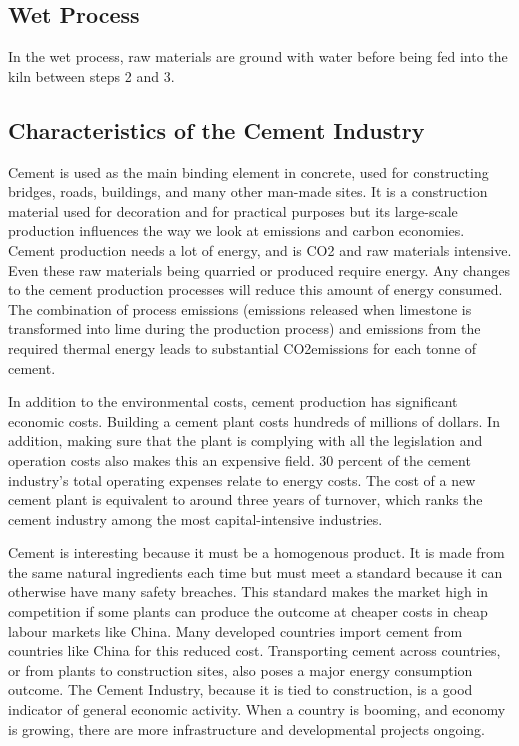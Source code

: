 \subsection{Wet Process}

In the wet process, raw materials are ground with water before being fed into the kiln between steps 2 and 3.

\subsection{Characteristics of the Cement Industry}

Cement is used as the main binding element in concrete, used for constructing bridges, roads, buildings, and many other man-made sites. It is a construction material used for decoration and for practical purposes but its large-scale production influences the way we look at emissions and carbon economies.
Cement production needs a lot of energy, and is CO2 and raw materials intensive. Even these raw materials being quarried or produced require energy. Any changes to the cement production processes will reduce this amount of energy consumed. The combination of process emissions (emissions released when limestone is transformed into lime during the production process) and emissions from the required thermal energy leads to substantial CO2emissions for each tonne of cement. 

In addition to the environmental costs, cement production has significant economic costs.  Building a cement plant costs hundreds of millions of dollars. In addition, making sure that the plant is complying with all the legislation and operation costs also makes this an expensive field. 30 percent of the cement industry's total operating expenses relate to energy costs. The cost of a new cement plant is equivalent to around three years of turnover, which ranks the cement industry among the most capital-intensive industries. 

Cement is interesting because it must be a homogenous product. It is made from the same natural ingredients each time but must meet a standard because it can otherwise have many safety breaches. This standard makes the market high in competition if some plants can produce the outcome at cheaper costs in cheap labour markets like China. Many developed countries import cement from countries like China for this reduced cost. Transporting cement across countries, or from plants to construction sites, also poses a major energy consumption outcome.
The Cement Industry, because it is tied to construction, is a good indicator of general economic activity. When a country is booming, and economy is growing, there are more infrastructure and developmental projects ongoing. 

